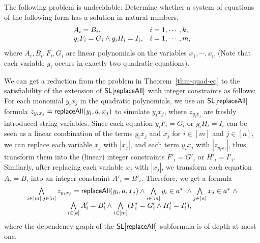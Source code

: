 \begin{theorem}[\cite{ID04}]\label{thm-quad-eq}
	The following problem is undecidable: Determine whether a system of equations of the following form has a solution in natural numbers, 
	\[
	\begin{array} {l l }
	A_i = B_i, & i =1, \cdots, k,\\
	y_iF_i=G_i \wedge y_i H_i = I_i, & i =1, \cdots, m, 
	\end{array}
	\] 
	where $A_i, B_i, F_i, G_i$ are linear polynomials on the variables $x_1,\cdots, x_n$ (Note that each variable $y_i$ occurs in exactly two quadratic equations).
\end{theorem}

We can get a reduction from the problem in Theorem~\ref{thm-quad-eq} to the satisfiability of the extension of $\mathsf{SL}[\mathsf{replaceAll}]$ with integer constraints as follows: For each monomial $y_i x_j$ in the quadratic polynomials, we use an $\mathsf{SL}[\mathsf{replaceAll}]$ formula $z_{y_i x_j} = \mathsf{replaceAll}(y_i, a, x_j)$ to simulate $y_i x_j$, where $z_{y_i x_j}$ are freshly introduced string variables. Since each equation $y_iF_i=G_i$ or $y_i H_i = I_i$ can be seen as a linear combination of the terms $y_i x_j$ and $x_j$ for $i \in [m]$ and $j \in [n]$, we can replace each variable $x_j$ with $|x_j|$, and each term $y_ix_j$ with $|z_{y_i x_j}|$,  thus transform them into the (linear) integer constraints $F'_i = G'_i$ or $H'_i = I'_i$. Similarly, after replacing each variable $x_j$ with $|x_j|$, we transform each equation $A_i= B_i$ into an integer constraint $A'_i = B'_i$. Therefore, we get a formula 
$$
\begin{array}{l c l }
\bigwedge \limits_{i \in [m], j \in [n]} z_{y_i x_j} = \replaceall(y_i, a, x_j) \wedge \bigwedge \limits_{i \in [m]} y_i \in a^*\ \wedge  \bigwedge \limits_{j \in [n]} x_j \in a^* \  \wedge\\
\hspace{2cm} \bigwedge \limits_{i \in [k]} A'_i = B'_i \wedge \bigwedge \limits_{i \in [m]} (F'_i = G'_i \wedge H'_i = I'_i),
\end{array}
$$
where the dependency graph of the $\mathsf{SL}[\mathsf{replaceAll}]$ subformula is of depth at most one.

